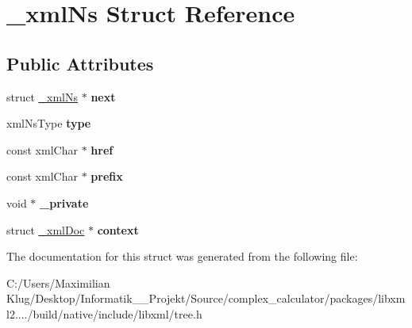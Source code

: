 \hypertarget{struct__xml_ns}{}\section{\+\_\+xml\+Ns Struct Reference}
\label{struct__xml_ns}
\subsection*{Public Attributes}
\begin{DoxyCompactItemize}
\item 
\mbox{\label{struct__xml_ns_ab79fd0a42e28dd61e73c131c58369a69}} 
struct \mbox{\hyperlink{struct__xml_ns}{\+\_\+xml\+Ns}} $\ast$ {\bfseries next}
\item 
\mbox{\label{struct__xml_ns_a84c713211df0640c7cfb1e7c64149214}} 
xml\+Ns\+Type {\bfseries type}
\item 
\mbox{\label{struct__xml_ns_a293a79d98f3e8dc28f9997fd9cf3bd04}} 
const xml\+Char $\ast$ {\bfseries href}
\item 
\mbox{\label{struct__xml_ns_a91810d0b5939f171f87bc75bbcdf8a2b}} 
const xml\+Char $\ast$ {\bfseries prefix}
\item 
\mbox{\label{struct__xml_ns_a3222313b0824c3269b6ecdcfc428b01d}} 
void $\ast$ {\bfseries \+\_\+private}
\item 
\mbox{\label{struct__xml_ns_ad809e6dac26d39564d2022f5fb287fa6}} 
struct \mbox{\hyperlink{struct__xml_doc}{\+\_\+xml\+Doc}} $\ast$ {\bfseries context}
\end{DoxyCompactItemize}


The documentation for this struct was generated from the following file\+:\begin{DoxyCompactItemize}
\item 
C\+:/\+Users/\+Maximilian Klug/\+Desktop/\+Informatik\+\_\+\_\+\+Projekt/\+Source/complex\+\_\+calculator/packages/libxml2..../build/native/include/libxml/tree.\+h\end{DoxyCompactItemize}
